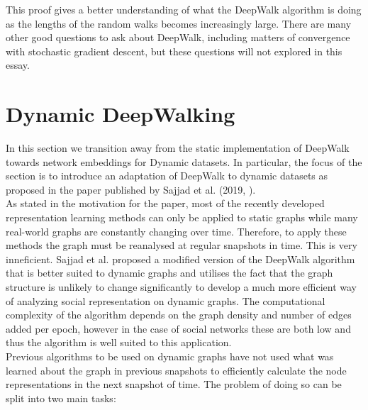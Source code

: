 \documentclass[a4paper]{article}
\begin{document}
\noindent This proof gives a better understanding of what the DeepWalk algorithm is doing as the lengths of the random walks becomes increasingly large.
There are many other good questions to ask about DeepWalk, including matters of convergence with stochastic gradient descent, but
these questions will not explored in this essay.
\section{Dynamic DeepWalking}
In this section we transition away from the static implementation of DeepWalk
towards network embeddings for Dynamic datasets. In particular, the focus of the
section is to introduce an adaptation of DeepWalk to dynamic datasets as
proposed in the paper published by Sajjad et al. (2019, \cite{sajjad2019}).\\
As stated in the motivation for the paper, most of the recently developed
representation learning methods can only be applied to static graphs while many
real-world graphs are constantly changing over time. Therefore, to apply these
methods the graph must be reanalysed at regular snapshots in time. This is very
inneficient. Sajjad et al. proposed a modified version of the DeepWalk
algorithm that is better suited to dynamic graphs and utilises the fact that the
graph structure is unlikely to change significantly to develop a much more
efficient way of analyzing social representation on dynamic graphs.
The computational complexity of the algorithm depends on the graph density and
number of edges added per epoch, however in the case of social networks these
are both low and thus the algorithm is well suited to this application.\\
Previous algorithms to be used on dynamic graphs have not used what
was learned about the graph in previous snapshots to efficiently calculate the
node representations in the next snapshot of time. The problem of doing so can
be split into two main tasks:
\end{document}
